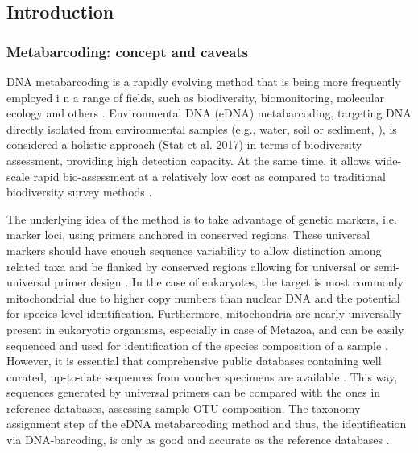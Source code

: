    \subsection{Introduction}
   \label{sec:darn-intro}

   \subsubsection{Metabarcoding: concept and caveats}
   \label{subsec:darn-intro-metabar}

   DNA metabarcoding is a rapidly evolving method that is being more frequently employed i
   n a range of fields, such as biodiversity, biomonitoring, molecular ecology and others 
   \citep{deiner2017environmental, ruppert2019past}. 
   Environmental DNA (eDNA) metabarcoding, targeting DNA directly isolated from environmental samples
   (e.g., water, soil or sediment, \citep{taberlet_environmental_2012}), is considered a holistic approach 
   (Stat et al. 2017) in terms of biodiversity assessment, providing high detection capacity. 
   At the same time, it allows wide-scale rapid bio-assessment \citep{stat2017ecosystem} at a relatively
   low cost as compared to traditional biodiversity survey methods \citep{ji2013reliable}.

   The underlying idea of the method is to take advantage of genetic markers, i.e. marker loci, 
   using primers anchored in conserved regions. 
   These universal markers should have enough sequence variability to allow distinction among 
   related taxa and be flanked by conserved regions allowing for universal or semi-universal primer design \citep{deagle2014dna}. 
   In the case of eukaryotes, the target is most commonly mitochondrial due to higher copy numbers than nuclear DNA and the potential for species level identification. 
   Furthermore, mitochondria are nearly universally present in eukaryotic organisms, especially in case of Metazoa, and can be easily sequenced and used for identification of the species composition of a sample \citep{taberlet2012towards}. 
   However, it is essential that comprehensive public databases containing well curated, up-to-date sequences from voucher specimens are available \citep{schenekar2020reference}. 
   This way, sequences generated by universal primers can be compared with the ones in reference databases, assessing sample OTU composition. 
   The taxonomy assignment step of the eDNA metabarcoding method and thus, the identification via DNA-barcoding, is only as good and accurate as the reference databases \citep{cilleros2019unlocking}. 


